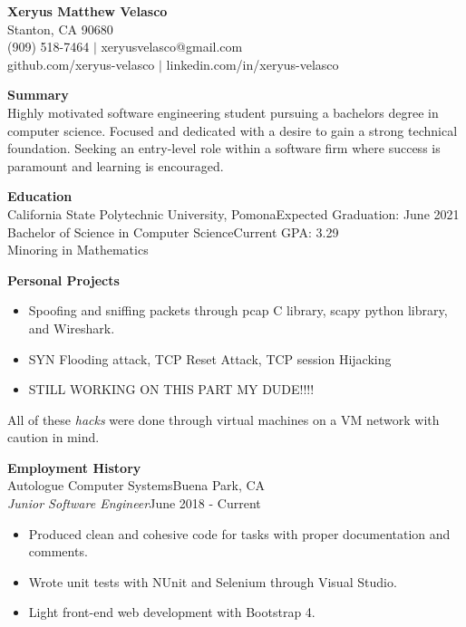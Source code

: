 \documentclass[12pt, letterpaper]{article}
\begin{document}
	\begin{flushleft}
		\textbf{\large Xeryus Matthew Velasco}\\
		Stanton, CA 90680\\
		(909) 518-7464 $\vert$ xeryusvelasco@gmail.com\\
		github.com/xeryus-velasco $\vert$ linkedin.com/in/xeryus-velasco\vspace{5mm}
		
\textbf{\large Summary}\\
Highly motivated software engineering student pursuing a bachelors degree in computer science. Focused and dedicated with a desire to gain a strong technical foundation. Seeking an entry-level role within a software firm where success is paramount and learning is encouraged.\vspace{5mm}

\textbf{\large Education}\\
California State Polytechnic University, Pomona\hfill Expected Graduation: June 2021\\
Bachelor of Science in Computer Science\hfill Current GPA: 3.29\\
Minoring in Mathematics\vspace{5mm}

\textbf{\large Personal Projects}\\
\begin{itemize}
	\item Spoofing and sniffing packets through pcap C library, scapy python library, and Wireshark.
	\item SYN Flooding attack, TCP Reset Attack, TCP session Hijacking 
	\item STILL WORKING ON THIS PART MY DUDE!!!!
\end{itemize}
All of these \textit{hacks} were done through virtual machines on a VM network with caution in mind.\vspace{5mm} 

\textbf{\large Employment History}\\
Autologue Computer Systems\hfill Buena Park, CA\\
\textit{Junior Software Engineer}\hfill June 2018 - Current
\begin{itemize}
  \item Produced clean and cohesive code for tasks with proper documentation and comments.
  \item Wrote unit tests with NUnit and Selenium through Visual Studio.
  \item Light front-end web development with Bootstrap 4.
\end{itemize}


\end{flushleft}
\end{document}
